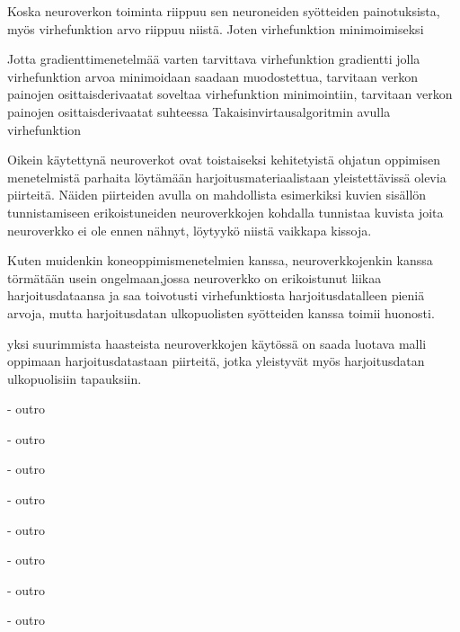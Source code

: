 \documentclass[finnish]{tktltiki2}
\begin{document}
  Koska neuroverkon toiminta riippuu sen neuroneiden syötteiden painotuksista, myös virhefunktion arvo riippuu niistä. Joten virhefunktion minimoimiseksi 

  Jotta gradienttimenetelmää varten tarvittava virhefunktion gradientti jolla virhefunktion arvoa minimoidaan saadaan muodostettua, tarvitaan verkon painojen osittaisderivaatat  soveltaa virhefunktion minimointiin, tarvitaan verkon painojen osittaisderivaatat suhteessa Takaisinvirtausalgoritmin avulla virhefunktion

  Oikein käytettynä neuroverkot ovat toistaiseksi kehitetyistä ohjatun oppimisen menetelmistä parhaita  löytämään harjoitusmateriaalistaan yleistettävissä olevia piirteitä. Näiden piirteiden avulla on mahdollista esimerkiksi kuvien sisällön tunnistamiseen erikoistuneiden neuroverkkojen kohdalla tunnistaa kuvista joita neuroverkko ei ole ennen nähnyt, löytyykö niistä vaikkapa kissoja.

  Kuten muidenkin koneoppimismenetelmien kanssa, neuroverkkojenkin kanssa törmätään usein ongelmaan,jossa neuroverkko on erikoistunut liikaa harjoitusdataansa ja saa toivotusti virhefunktiosta harjoitusdatalleen pieniä arvoja, mutta harjoitusdatan ulkopuolisten syötteiden kanssa toimii huonosti.
  
  yksi suurimmista haasteista neuroverkkojen käytössä on saada luotava malli oppimaan harjoitusdatastaan piirteitä, jotka yleistyvät myös harjoitusdatan ulkopuolisiin tapauksiin.


  - outro

  - outro

  - outro

  - outro

  - outro

  - outro

  - outro

  - outro





  
\end{document}
